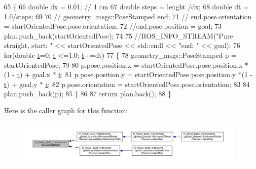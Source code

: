 \begin{DoxyCode}
65     \{
66         \textcolor{keywordtype}{double} dx = 0.01; \textcolor{comment}{// 1 cm}
67         \textcolor{keywordtype}{double} steps = lenght /dx;
68         \textcolor{keywordtype}{double} dt = 1.0/steps;
69 
70         \textcolor{comment}{// geometry\_msgs::PoseStamped end;}
71         \textcolor{comment}{// end.pose.orientation = startOrientedPose.pose.orientation;}
72         \textcolor{comment}{//end.pose.position = goal;}
73         plan.push\_back(startOrientedPose);
74 
75         \textcolor{comment}{//ROS\_INFO\_STREAM("Pure straight, start: " << startOrientedPose << std::endl << "end: " << goal);}
76         \textcolor{keywordflow}{for}(\textcolor{keywordtype}{double} \hyperlink{namespacebattery__monitor__node_a7a63d20d1ea461e280f4eb5b47f925cd}{t}=0; \hyperlink{namespacebattery__monitor__node_a7a63d20d1ea461e280f4eb5b47f925cd}{t} <=1.0; \hyperlink{namespacebattery__monitor__node_a7a63d20d1ea461e280f4eb5b47f925cd}{t}+=dt)
77         \{
78             geometry\_msgs::PoseStamped p = startOrientedPose;
79             
80             p.pose.position.x =  startOrientedPose.pose.position.x *(1 - \hyperlink{namespacebattery__monitor__node_a7a63d20d1ea461e280f4eb5b47f925cd}{t}) + goal.x * 
      \hyperlink{namespacebattery__monitor__node_a7a63d20d1ea461e280f4eb5b47f925cd}{t};
81             p.pose.position.y =  startOrientedPose.pose.position.y *(1 - \hyperlink{namespacebattery__monitor__node_a7a63d20d1ea461e280f4eb5b47f925cd}{t}) + goal.y * 
      \hyperlink{namespacebattery__monitor__node_a7a63d20d1ea461e280f4eb5b47f925cd}{t};
82             p.pose.orientation = startOrientedPose.pose.orientation;
83             
84             plan.push\_back(p);
85         \}
86     
87         \textcolor{keywordflow}{return} plan.back();
88     \}
\end{DoxyCode}
Here is the caller graph for this function\+:
\nopagebreak
\begin{figure}[H]
\begin{center}
\leavevmode
\includegraphics[width=350pt]{namespacecl__move__base__z_a1d6998cc28a1847906272f2bf92bacc8_icgraph}
\end{center}
\end{figure}
